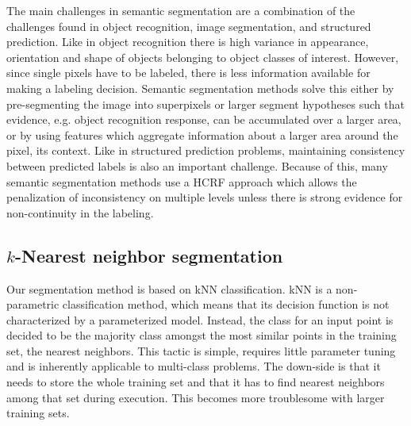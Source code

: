 \documentclass[a4paper,titlepage]{article}
\begin{document}
The main challenges in semantic segmentation are a combination of the challenges found in object recognition, image segmentation, and structured prediction. Like in object recognition there is high variance in appearance, orientation and shape of objects belonging to object classes of interest. However, since single pixels have to be labeled, there is less information available for making a labeling decision. Semantic segmentation methods solve this either by pre-segmenting the image into superpixels or larger segment hypotheses such that evidence, e.g. object recognition response, can be accumulated over a larger area, or by using features which aggregate information about a larger area around the pixel, its context. Like in structured prediction problems, maintaining consistency between predicted labels is also an important challenge. Because of this, many semantic segmentation methods use a \ac{HCRF} approach which allows the penalization of inconsistency on multiple levels unless there is strong evidence for non-continuity in the labeling.

\subsection{$k$-Nearest neighbor segmentation}

Our segmentation method is based on \acf{kNN} classification. \ac{kNN} is a non-parametric classification method, which means that its decision function is not characterized by a parameterized model. Instead, the class for an input point is decided to be the majority class amongst the most similar points in the training set, the nearest neighbors. This tactic is simple, requires little parameter tuning and is inherently applicable to multi-class problems. The down-side is that it needs to store the whole training set and that it has to find nearest neighbors among that set during execution. This becomes more troublesome with larger training sets. 
\end{document}
